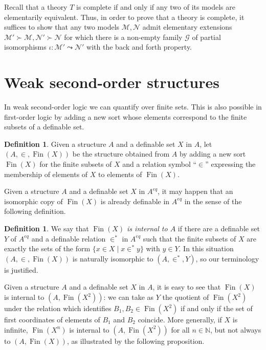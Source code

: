 \documentclass{amsart}
\newcommand{\N}{\mathbb N}
\newcommand{\ca}{\mathcal}
\newcommand{\Fin}{\operatorname{Fin}}
\theoremstyle{plain}
\theoremstyle{definition}
\newtheorem{defn}[thm]{Definition}
\newcommand{\ins}{\in^*}
\newcommand{\pto}{\leadsto} %
\begin{document}
Recall that a theory $T$ is complete if and only if any two of its models are elementarily equivalent. Thus, in order to prove that a theory is complete, it suffices to show that any two models $\ca M, \ca N$ admit elementary extensions $\ca M'\succ \ca M, \ca N'\succ \ca N$ for which there is a non-empty family $\ca G$ of partial isomorphisms $\iota: \ca M' \pto \ca N'$ with the back and forth property. 

\section{Weak second-order structures}\label{sec:wsostr}

In weak second-order logic we can quantify over finite sets. This is also possible in first-order logic by adding a new sort whose elements correspond to the finite subsets of a definable set. 

\begin{defn} 
Given a structure $A$ and a definable set $X$ in $A$, let $(A, \in, \Fin (X))$ be the structure obtained from $A$ by adding a new sort $\Fin (X)$ for the finite subsets of $X$ and a relation symbol ``$\in$'' expressing the membership of elements of $X$ to elements of $\Fin (X)$. 
\end{defn}

Given a structure $A$ and a definable set $X$ in $A^{eq}$, it may happen that an isomorphic copy of $\Fin(X)$ is already definable in $A^{eq}$ in the sense of the following definition. 

\begin{defn}
We say that {\em $\Fin(X)$ is internal to $A$} if there are a definable set $Y$ of $A^{eq}$ and a definable relation $\ins$ in $A^{eq}$ such that the finite subsets of $X$ are exactly the sets of the form $\{x\in X \mid x\ins y\}$ with  $y\in Y$. In this situation $(A, \in, \Fin(X))$ is naturally isomorphic to $(A, \ins, Y)$, so our terminology is justified.
\end{defn}


Given a structure $A$ and a definable set $X$ in $A$, it is easy to see that $\Fin(X)$ is internal to $(A, \Fin(X^2))$: we can take as $Y$ the quotient of $\Fin(X^2)$ under the relation which identifies $B_1,B_2 \in \Fin(X^2)$ if and only if the set of first coordinates of elements of $B_1$ and $B_2$ coincide. More generally, if $X$ is infinite, $\Fin(X^n)$ is internal to $(A, \Fin(X^2))$ for all $n\in \N$, but not always to $(A, \Fin(X))$, as illustrated by the following proposition.
\end{document}
